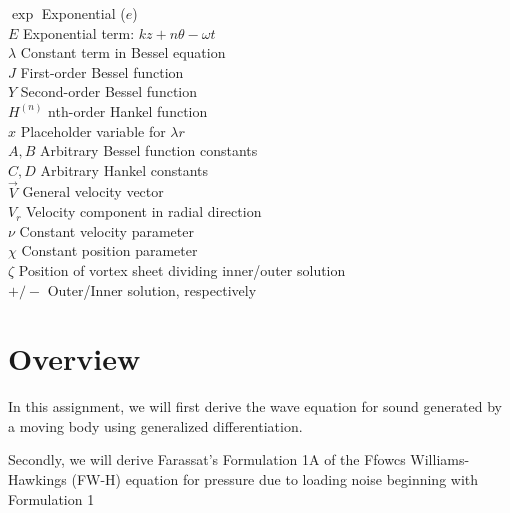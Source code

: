 \documentclass[]{aiaa-tc}%
\begin{document}
\begin{multicols}{2}
\begin{tabbing}
  $\exp$              \> Exponential ($e$) \\
  $E$                 \> Exponential term: $kz + n\theta -\omega t$ \\
  $\lambda$           \> Constant term in Bessel equation \\
  $J$                 \> First-order Bessel function \\
  $Y$                 \> Second-order Bessel function \\
  $H^{(n)}$           \> nth-order Hankel function \\
  $x$                 \> Placeholder variable for $\lambda r$ \\
  $A,B$               \> Arbitrary Bessel function constants \\
  $C,D$               \> Arbitrary Hankel constants \\
  $\vec{V}$           \> General velocity vector \\
  $V_r$               \> Velocity component in radial direction \\
  $\nu$               \> Constant velocity parameter \\
  $\chi$              \> Constant position parameter \\
  $\zeta$             \> Position of vortex sheet dividing inner/outer solution \\
  $+/-$               \> Outer/Inner solution, respectively \\





\end{tabbing}

\end{multicols}

\section*{Overview} %

In this assignment, we will first derive the wave equation for sound generated by a moving body using generalized differentiation.

Secondly, we will derive Farassat's Formulation 1A of the Ffowcs Williams-Hawkings (FW-H) equation for pressure due to loading noise beginning with Formulation 1
\end{document}
